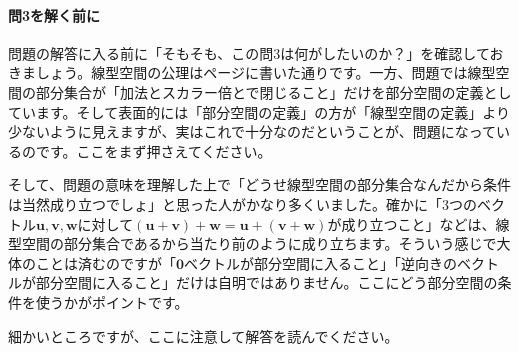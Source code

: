 \paragraph{問3を解く前に} 問題の解答に入る前に「そもそも、この問3は何がしたいのか？」を確認しておきましょう。線型空間の公理は\pageref{def:vector_space}ページに書いた通りです。一方、問題では線型空間の部分集合が「加法とスカラー倍とで閉じること」だけを部分空間の定義としています。そして表面的には「部分空間の定義」の方が「線型空間の定義」より少ないように見えますが、実はこれで十分なのだということが、問題になっているのです。ここをまず押さえてください。

そして、問題の意味を理解した上で「どうせ線型空間の部分集合なんだから条件は当然成り立つでしょ」と思った人がかなり多くいました。確かに「$3$つのベクトル$\bm{u}, \bm{v}, \bm{w}$に対して$(\bm{u} + \bm{v}) + \bm{w} = \bm{u} + (\bm{v} + \bm{w})$が成り立つこと」などは、線型空間の部分集合であるから当たり前のように成り立ちます。そういう感じで大体のことは済むのですが「$\bm{0}$ベクトルが部分空間に入ること」「逆向きのベクトルが部分空間に入ること」だけは自明ではありません。ここにどう部分空間の条件を使うかがポイントです。

細かいところですが、ここに注意して解答を読んでください。

